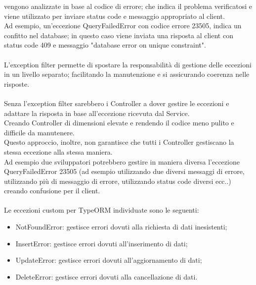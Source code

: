 vengono analizzate in base al codice di errore; che indica il problema verificatosi e viene utilizzato 
per inviare status code e messaggio appropriato al client.
\\
Ad esempio, un'eccezione QueryFailedError con codice errore 23505, indica un confitto nel database; in questo caso viene
inviata una risposta al client con status code 409 e messaggio "database error on unique constraint".
\\\\
L'exception filter permette di spostare la responsabilità di gestione delle eccezioni in un livello
separato; facilitando la manutenzione e si assicurando coerenza nelle risposte.
\\\\
Senza l'exception filter sarebbero i Controller a dover gestire le eccezioni e adattare la risposta
in base all'eccezione ricevuta dal Service.
\\
Creando Controller di dimensioni elevate e rendendo il codice meno pulito e difficile
da manutenere. 
\\
Questo approccio, inoltre, non garantisce che tutti i Controller gestiscano la stessa eccezione
alla stessa maniera. 
\\
Ad esempio due sviluppatori potrebbero gestire in maniera diversa l'eccezione QueryFailedError 23505 (ad esempio utilizzando
due diversi messaggi di errore,
utilizzando più di messaggio di errore, utilizzando status code diversi ecc..)
creando confusione per il client.
\\\\
Le eccezioni custom per TypeORM individuate sono le seguenti:
\begin{itemize}
    \item NotFoundError: gestisce errori dovuti alla richiesta di dati inesistenti;
    \item InsertError: gestisce errori dovuti all'inserimento di dati;
    \item UpdateError: gestisce errori dovuti all'aggiornamento di dati;
    \item DeleteError: gestisce errori dovuti alla cancellazione di dati.
\end{itemize}
\leavevmode\newline

